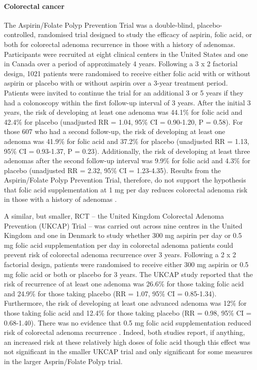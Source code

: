 \paragraph{Colorectal cancer} %
The Aspirin/Folate Polyp Prevention Trial was a double-blind, placebo-controlled, randomised trial designed to study the efficacy of aspirin, folic acid, or both for colorectal adenoma recurrence in those with a history of adenomas. Participants were recruited at eight clinical centers in the United States and one in Canada over a period of approximately 4 years. Following a 3 x 2 factorial design, 1021 patients were randomised to receive either folic acid with or without aspirin or placebo with or without aspirin over a 3-year treatment period. Patients were invited to continue the trial for an additional 3 or 5 years if they had a colonoscopy within the first follow-up interval of 3 years. After the initial 3 years, the risk of developing at least one adenoma was 44.1\% for folic acid and 42.4\% for placebo (unadjusted RR = 1.04, 95\% CI = 0.90-1.20, P = 0.58). For those 607 who had a second follow-up, the risk of developing at least one adenoma was 41.9\% for folic acid and 37.2\% for placebo (unadjusted 
RR = 1.13, 95\% CI = 0.93-1.37, P = 0.23). Additionally, the risk of developing at least three adenomas after the second follow-up interval was 9.9\% for folic acid and 4.3\% for placebo (unadjusted RR = 2.32, 95\% CI = 1.23-4.35). Results from the Aspirin/Folate Polyp Prevention Trial, therefore, do not support the hypothesis that folic acid supplementation at 1 mg per day reduces colorectal adenoma risk in those with a history of adenomas \cite{c238}. 
 
\noindent A similar, but smaller, RCT -- the United Kingdom Colorectal Adenoma Prevention (UKCAP) Trial -- was carried out across nine centres in the United Kingdom and one in Denmark to study whether 300 mg aspirin per day or 0.5 mg folic acid supplementation per day in colorectal adenoma patients could prevent risk of colorectal adenoma recurrence over 3 years. Following a 2 x 2 factorial design, patients were randomised to receive either 300 mg aspirin or 0.5 mg folic acid or both or placebo for 3 years. The UKCAP study reported that the risk of recurrence of at least one adenoma was 26.6\% for those taking folic acid and 24.9\% for those taking placebo (RR = 1.07, 95\% CI = 0.85-1.34). Furthermore, the risk of developing at least one advanced adenoma was 12\% for those taking folic acid and 12.4\% for those taking placebo (RR = 0.98, 95\% CI = 0.68-1.40). There was no evidence that 0.5 mg folic acid supplementation reduced risk of colorectal adenoma recurrence \cite{c239}. Indeed, both studies report, if 
anything, an increased risk at these relatively high doses of folic acid though this effect was not significant in the smaller UKCAP trial and only significant for some measures in the larger Asprin/Folate Polyp trial. 
 
